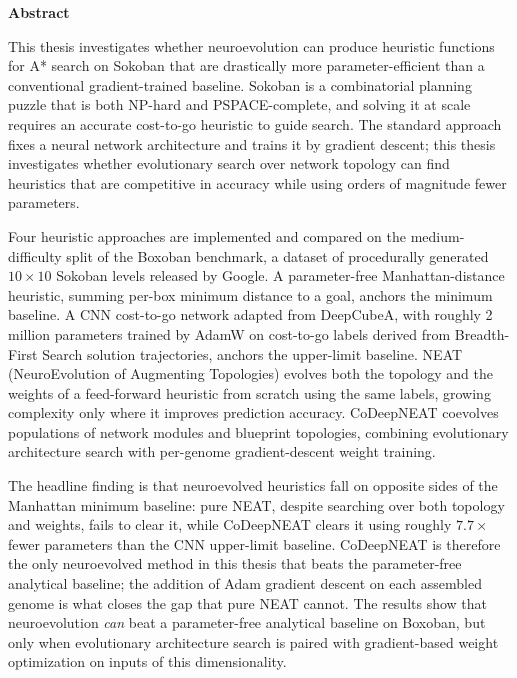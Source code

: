 
\begin{center}
    \vspace{0.9cm}
    \textbf{Abstract}
\end{center}

This thesis investigates whether neuroevolution can produce heuristic functions for A* search on Sokoban that are drastically more parameter-efficient than a conventional
gradient-trained baseline. Sokoban is a combinatorial planning puzzle that is both NP-hard and
PSPACE-complete, and solving it at scale requires an accurate cost-to-go heuristic to guide
search. The standard approach fixes a neural network architecture and trains it by gradient
descent; this thesis investigates whether evolutionary search over network topology can find heuristics
that are competitive in accuracy while using orders of magnitude fewer parameters.

Four heuristic approaches are implemented and compared on the medium-difficulty
split of the Boxoban benchmark, a dataset of procedurally generated $10\times10$
Sokoban levels released by Google. A parameter-free Manhattan-distance heuristic,
summing per-box minimum distance to a goal, anchors the minimum baseline. A CNN
cost-to-go network adapted from DeepCubeA, with roughly 2 million parameters
trained by AdamW on cost-to-go labels derived from Breadth-First Search solution
trajectories, anchors the upper-limit baseline. NEAT (NeuroEvolution of
Augmenting Topologies) evolves both the topology and the weights of a
feed-forward heuristic from scratch using the same labels, growing complexity only
where it improves prediction accuracy. CoDeepNEAT coevolves populations of network
modules and blueprint topologies, combining evolutionary architecture search with
per-genome gradient-descent weight training.

The headline finding is that neuroevolved heuristics fall on opposite sides of the
Manhattan minimum baseline: pure NEAT, despite searching over both topology and
weights, fails to clear it, while CoDeepNEAT clears it using roughly $7.7\times$
fewer parameters than the CNN upper-limit baseline. CoDeepNEAT is therefore the
only neuroevolved method in this thesis that beats the parameter-free analytical
baseline; the addition of Adam gradient descent on each assembled genome is what
closes the gap that pure NEAT cannot. The results show that neuroevolution
\emph{can} beat a parameter-free analytical baseline on Boxoban, but only when
evolutionary architecture search is paired with gradient-based weight optimization
on inputs of this dimensionality.

